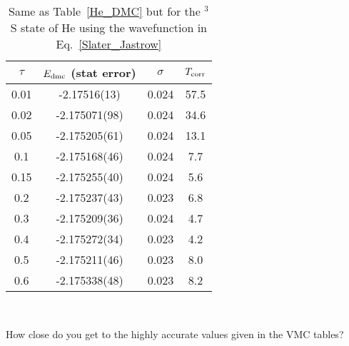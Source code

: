 \documentclass[11pt,aps,prb,amsmath,amssymb,superscriptaddress,notitlepage]{revtex4-1}
\def\Tcorr{T_{\rm corr}}
\providecommand{\tabularnewline}{\\}
\begin{document}
{\begin{table}[H]
\begin{center}
\color{blue}
\caption{Same as Table~\ref{He_DMC} but for the $^3$S state of He using the wavefunction in Eq.~\ref{Slater_Jastrow}}
\label{H-_DMC}
\begin{tabular}{|c|c|c|c|}
\hline 
$\tau$ & \multicolumn{1}{c}{$E_{\rm dmc}$ (stat error)} | & $\sigma$ & $\Tcorr$ \tabularnewline
\hline 
0.01 & -2.17516(13) & 0.024 & 57.5 \tabularnewline
0.02 & -2.175071(98) & 0.024 & 34.6 \tabularnewline
0.05 & -2.175205(61) & 0.024 & 13.1 \tabularnewline
0.1 &  -2.175168(46) & 0.024 & 7.7 \tabularnewline
0.15 & -2.175255(40) & 0.024 & 5.6 \tabularnewline
0.2 & -2.175237(43) & 0.023 & 6.8 \tabularnewline
0.3 & -2.175209(36) & 0.024 & 4.7 \tabularnewline
0.4 & -2.175272(34) & 0.023 & 4.2 \tabularnewline
0.5 & -2.175211(46) & 0.023 & 8.0  \tabularnewline
0.6 & -2.175338(48) & 0.023 & 8.2 \tabularnewline
\hline 
\end{tabular}\\
\end{center}
\end{table}

How close do you get to the highly accurate values given in the VMC tables?

}
\end{document}
